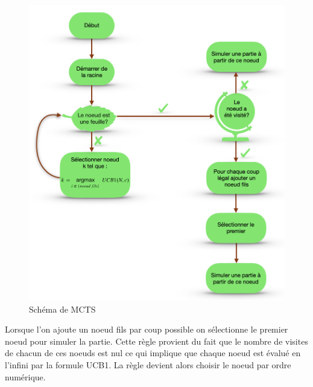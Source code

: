 \documentclass[12pt]{article}
\begin{document}
\newpage
\begin{figure}[h!]
		\centering
		\includegraphics[width = 1\textwidth]{images/mcts.png}
		\caption{Schéma de MCTS}
		\label{eq1}
	\end{figure}
Lorsque l’on ajoute un noeud fils par coup possible on sélectionne le premier noeud pour
simuler la partie. Cette règle provient du fait que le nombre de visites de chacun de ces
noeuds est nul ce qui implique que chaque noeud est évalué en l’infini par la formule
UCB1. La règle devient alors choisir le noeud par ordre numérique.
\end{document}
